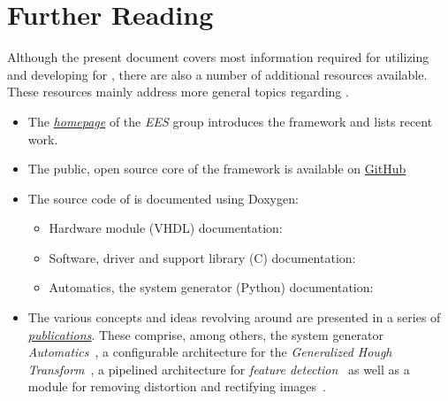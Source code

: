 \section{Further Reading}

Although the present document covers most information required for utilizing and developing for \asterics, there are also a number of additional resources available.
These resources mainly address more general topics regarding \asterics.


\begin{itemize}
\item The \href{https://ees.hs-augsburg.de/asterics/index_en.html}{\textit{\asterics homepage}} of the \textit{EES} group introduces the framework and lists recent work.
\item The public, open source core of the \asterics framework is available on \href{https://github.com/hsa-ees/asterics}{GitHub} 
\item The source code of \asterics is documented using Doxygen:
\begin{itemize}
\item Hardware module (VHDL) documentation: 
\item Software, driver and support library (C) documentation: 
\item Automatics, the \asterics system generator (Python) documentation: 
\end{itemize}
\item The various concepts and ideas revolving around \asterics are presented in a series of \href{https://ees.hs-augsburg.de/publikationen/index_en.html}{\textit{publications}}.
These comprise, among others, the system generator \textit{Automatics}~\cite{manke_ew2020}, a configurable architecture for the \textit{Generalized Hough Transform}~\cite{kiefer_configurable_2016}, a pipelined architecture for \textit{feature detection}~\cite{pohl_efficient_2014} as well as a module for removing distortion and rectifying images~\cite{pohl_efficient_2012}.
\end{itemize}




